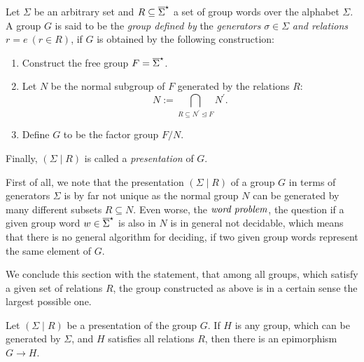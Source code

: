\begin{definition}
Let $\Sigma$ be an arbitrary set and $R \subseteq {\overline{\Sigma}}^{\star}$ a set of group words over the alphabet $\Sigma$. A group $G$ is said to be the \emph{group defined by} the \emph{generators} $\sigma \in \Sigma$ \emph{and relations} $r = e\ (r \in R)$, if $G$ is obtained by the following construction:
\begin{enumerate}
\item Construct the free group $F = {\overline{\Sigma}}^{\star}$.
\item Let $N$ be the normal subgroup of $F$ generated by the relations $R$:
\begin{equation*}
N := \bigcap_{R \subseteq N^{\prime} \unlhd F} N^{\prime}.
\end{equation*}
\item Define $G$ to be the factor group $F/N$.
\end{enumerate}
Finally, $(\Sigma \mid R)$ is called a \emph{presentation} of $G$.
\end{definition}
\begin{remark}
First of all, we note that the presentation $(\Sigma \mid R)$ of a group $G$ in terms of generators $\Sigma$ is by far not unique as the normal group $N$ can be generated by many different subsets $R \subseteq N$. Even worse, the $\emph{word problem}$, \ie the question if a given group word $w \in {\overline{\Sigma}}^{\star}$ is also in $N$ is in general not decidable, which means that there is no general algorithm for deciding, if two given group words represent the same element of $G$.
\end{remark}

We conclude this section with the statement, that among all groups, which satisfy a given set of relations $R$, the group constructed as above is in a certain sense the largest possible one.

\begin{theorem}
Let $(\Sigma \mid R)$ be a presentation of the group $G$. If $H$ is any group, which can be generated by $\Sigma$, and $H$ satisfies all relations $R$, then there is an epimorphism $G \to H$.
\end{theorem}
